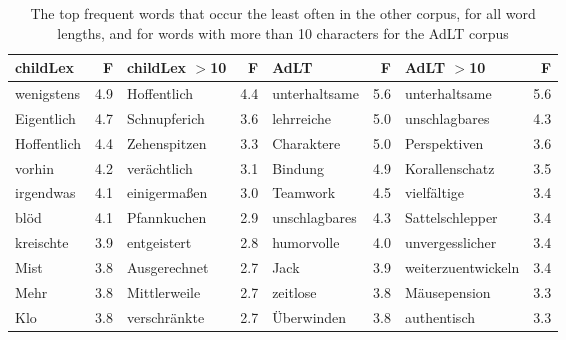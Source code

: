 \documentclass[doc, a4paper, anonymous]{apa7}
\begin{document}
\begin{table}[!htbp]
\caption{The top frequent words that occur the least often in the other corpus, for all word lengths, and for words with more than 10 characters for the AdLT corpus}
\centering
\begin{tabular}{lrlrlrlr}
  \hline
childLex & F & childLex $>$10 & F & AdLT & F & AdLT $>$10 & F \\ 
  \hline
wenigstens & 4.9 & Hoffentlich & 4.4 & unterhaltsame & 5.6 & unterhaltsame & 5.6 \\ 
  Eigentlich & 4.7 & Schnupferich & 3.6 & lehrreiche & 5.0 & unschlagbares & 4.3 \\ 
  Hoffentlich & 4.4 & Zehenspitzen & 3.3 & Charaktere & 5.0 & Perspektiven & 3.6 \\ 
  vorhin & 4.2 & verächtlich & 3.1 & Bindung & 4.9 & Korallenschatz & 3.5 \\ 
  irgendwas & 4.1 & einigermaßen & 3.0 & Teamwork & 4.5 & vielfältige & 3.4 \\ 
  blöd & 4.1 & Pfannkuchen & 2.9 & unschlagbares & 4.3 & Sattelschlepper & 3.4 \\ 
  kreischte & 3.9 & entgeistert & 2.8 & humorvolle & 4.0 & unvergesslicher & 3.4 \\ 
  Mist & 3.8 & Ausgerechnet & 2.7 & Jack & 3.9 & weiterzuentwickeln & 3.4 \\ 
  Mehr & 3.8 & Mittlerweile & 2.7 & zeitlose & 3.8 & Mäusepension & 3.3 \\ 
  Klo & 3.8 & verschränkte & 2.7 & Überwinden & 3.8 & authentisch & 3.3 \\ 
   \hline
\end{tabular}
\label{words-adlt-low}
\end{table}
\end{document}
